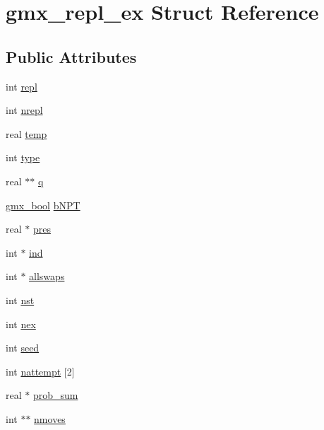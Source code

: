 \hypertarget{structgmx__repl__ex}{\section{gmx\-\_\-repl\-\_\-ex \-Struct \-Reference}
\label{structgmx__repl__ex}
}
\subsection*{\-Public \-Attributes}
\begin{DoxyCompactItemize}
\item 
int \hyperlink{structgmx__repl__ex_a276b62d3118eb3b5132e66da2c1fd577}{repl}
\item 
int \hyperlink{structgmx__repl__ex_a12d153ac45ac80803287c12c5c0ae2e0}{nrepl}
\item 
real \hyperlink{structgmx__repl__ex_af483c0a60b6afdfe8c804ca5b1d58e55}{temp}
\item 
int \hyperlink{structgmx__repl__ex_a13e0d57ae2c0a6ef5e94f6366eaa4e3b}{type}
\item 
real $\ast$$\ast$ \hyperlink{structgmx__repl__ex_ae82b81466a65bdbefa4a279624da614b}{q}
\item 
\hyperlink{include_2types_2simple_8h_a8fddad319f226e856400d190198d5151}{gmx\-\_\-bool} \hyperlink{structgmx__repl__ex_a44fe3005f21d838b91d36c1ccebdd615}{b\-N\-P\-T}
\item 
real $\ast$ \hyperlink{structgmx__repl__ex_a4727f9623b6a6995110132c968cb2165}{pres}
\item 
int $\ast$ \hyperlink{structgmx__repl__ex_a34029cb14ba137ec341d4f98e596d056}{ind}
\item 
int $\ast$ \hyperlink{structgmx__repl__ex_aede2815b408699eda305e66b65222a6b}{allswaps}
\item 
int \hyperlink{structgmx__repl__ex_a6288eb1110e47d89ac0ba9f04bf86e0d}{nst}
\item 
int \hyperlink{structgmx__repl__ex_ab5c0bdf0ec427dd6f3423b400d5dc4c4}{nex}
\item 
int \hyperlink{structgmx__repl__ex_a361aebb35292ccabe9cc53e6fee091f4}{seed}
\item 
int \hyperlink{structgmx__repl__ex_a6cf1978ca56b40aee428815d6cf1f37c}{nattempt} \mbox{[}2\mbox{]}
\item 
real $\ast$ \hyperlink{structgmx__repl__ex_afe91de4fe29e4757a00af03b1d4da003}{prob\-\_\-sum}
\item 
int $\ast$$\ast$ \hyperlink{structgmx__repl__ex_ac8dd9c7860121f300cbe0e223a6be35c}{nmoves}

\end{DoxyCompactItemize}
